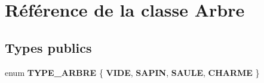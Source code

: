 \hypertarget{class_arbre}{}\section{Référence de la classe Arbre}
\label{class_arbre}
\subsection*{Types publics}
\begin{DoxyCompactItemize}
\item 
\hypertarget{class_arbre_a21a8d2d64dda296e5695026fd96083d0}{}enum {\bfseries T\+Y\+P\+E\+\_\+\+A\+R\+B\+R\+E} \{ {\bfseries V\+I\+D\+E}, 
{\bfseries S\+A\+P\+I\+N}, 
{\bfseries S\+A\+U\+L\+E}, 
{\bfseries C\+H\+A\+R\+M\+E}
 \}\label{class_arbre_a21a8d2d64dda296e5695026fd96083d0}

\end{DoxyCompactItemize}
